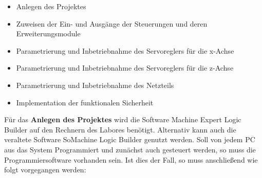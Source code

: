 \documentclass[../../../Bachelorarbeit.tex]{subfiles}
\begin{document}
\begin{itemize}
    \item Anlegen des Projektes
    \item Zuweisen der Ein- und Ausgänge der Steuerungen und deren Erweiterungsmodule
    \item Parametrierung und Inbetriebnahme des Servoreglers für die x-Achse
    \item Parametrierung und Inbetriebnahme des Servoreglers für die z-Achse
    \item Parametrierung und Inbetriebnahme des Netzteils
    \item Implementation der funktionalen Sicherheit
\end{itemize}

Für das \textbf{Anlegen des Projektes} wird die Software Machine Expert Logic Builder auf den Rechnern des Labores benötigt. Alternativ kann auch die veraltete Software SoMachine Logic Builder genutzt werden. Soll von jedem PC aus das System Programmiert und zunächst auch gesteuert werden, so muss die Programmiersoftware vorhanden sein. Ist dies der Fall, so muss anschließend wie folgt vorgegangen werden:
\end{document}
